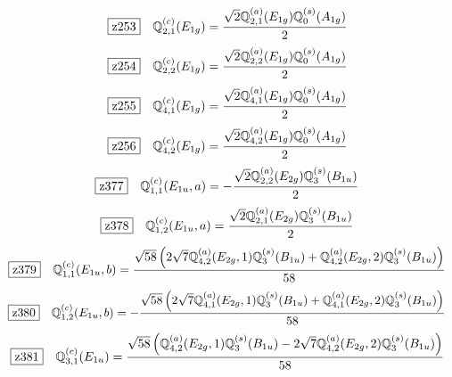 \documentclass[fleqn,10pt,landscape]{jsarticle}
\begin{document}
\begin{dmath*}
\hspace*{3mm}\fbox{z253}\quad \mathbb{Q}_{2,1}^{(c)}(E_{1g})=\frac{\sqrt{2} \mathbb{Q}_{2,1}^{(a)}(E_{1g}) \mathbb{Q}_{0}^{(s)}(A_{1g})}{2}
\end{dmath*}
\begin{dmath*}
\hspace*{3mm}\fbox{z254}\quad \mathbb{Q}_{2,2}^{(c)}(E_{1g})=\frac{\sqrt{2} \mathbb{Q}_{2,2}^{(a)}(E_{1g}) \mathbb{Q}_{0}^{(s)}(A_{1g})}{2}
\end{dmath*}
\begin{dmath*}
\hspace*{3mm}\fbox{z255}\quad \mathbb{Q}_{4,1}^{(c)}(E_{1g})=\frac{\sqrt{2} \mathbb{Q}_{4,1}^{(a)}(E_{1g}) \mathbb{Q}_{0}^{(s)}(A_{1g})}{2}
\end{dmath*}
\begin{dmath*}
\hspace*{3mm}\fbox{z256}\quad \mathbb{Q}_{4,2}^{(c)}(E_{1g})=\frac{\sqrt{2} \mathbb{Q}_{4,2}^{(a)}(E_{1g}) \mathbb{Q}_{0}^{(s)}(A_{1g})}{2}
\end{dmath*}
\begin{dmath*}
\hspace*{3mm}\fbox{z377}\quad \mathbb{Q}_{1,1}^{(c)}(E_{1u},a)=- \frac{\sqrt{2} \mathbb{Q}_{2,2}^{(a)}(E_{2g}) \mathbb{Q}_{3}^{(s)}(B_{1u})}{2}
\end{dmath*}
\begin{dmath*}
\hspace*{3mm}\fbox{z378}\quad \mathbb{Q}_{1,2}^{(c)}(E_{1u},a)=\frac{\sqrt{2} \mathbb{Q}_{2,1}^{(a)}(E_{2g}) \mathbb{Q}_{3}^{(s)}(B_{1u})}{2}
\end{dmath*}
\begin{dmath*}
\hspace*{3mm}\fbox{z379}\quad \mathbb{Q}_{1,1}^{(c)}(E_{1u},b)=\frac{\sqrt{58} \left(2 \sqrt{7} \mathbb{Q}_{4,2}^{(a)}(E_{2g},1) \mathbb{Q}_{3}^{(s)}(B_{1u}) + \mathbb{Q}_{4,2}^{(a)}(E_{2g},2) \mathbb{Q}_{3}^{(s)}(B_{1u})\right)}{58}
\end{dmath*}
\begin{dmath*}
\hspace*{3mm}\fbox{z380}\quad \mathbb{Q}_{1,2}^{(c)}(E_{1u},b)=- \frac{\sqrt{58} \left(2 \sqrt{7} \mathbb{Q}_{4,1}^{(a)}(E_{2g},1) \mathbb{Q}_{3}^{(s)}(B_{1u}) + \mathbb{Q}_{4,1}^{(a)}(E_{2g},2) \mathbb{Q}_{3}^{(s)}(B_{1u})\right)}{58}
\end{dmath*}
\begin{dmath*}
\hspace*{3mm}\fbox{z381}\quad \mathbb{Q}_{3,1}^{(c)}(E_{1u})=\frac{\sqrt{58} \left(\mathbb{Q}_{4,2}^{(a)}(E_{2g},1) \mathbb{Q}_{3}^{(s)}(B_{1u}) - 2 \sqrt{7} \mathbb{Q}_{4,2}^{(a)}(E_{2g},2) \mathbb{Q}_{3}^{(s)}(B_{1u})\right)}{58}
\end{dmath*}
\end{document}
